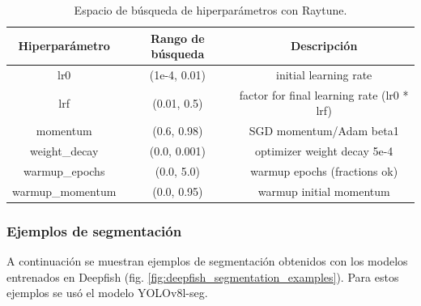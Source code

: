 \begin{table}[htbp]
\centering
\caption[Espacio de búsqueda de hiperparámetros con Raytune]{Espacio de búsqueda de hiperparámetros con Raytune.}
\label{tab:search_space}
\begin{tabular}{|c|c|c|}
\hline
\textbf{Hiperparámetro} & \textbf{Rango de búsqueda} & \textbf{Descripción} \\ \hline
lr0 & (1e-4, 0.01) & initial learning rate \\ \hline
lrf & (0.01, 0.5) & factor for final learning rate (lr0 * lrf) \\ \hline
momentum & (0.6, 0.98) & SGD momentum/Adam beta1 \\ \hline
weight\_decay & (0.0, 0.001) & optimizer weight decay 5e-4 \\ \hline
warmup\_epochs & (0.0, 5.0) & warmup epochs (fractions ok) \\ \hline
warmup\_momentum & (0.0, 0.95) & warmup initial momentum \\ \hline
\end{tabular}
\end{table}


\subsubsection{Ejemplos de segmentación}
A continuación se muestran ejemplos de segmentación obtenidos con los modelos entrenados en Deepfish (fig. \ref{fig:deepfish_segmentation_examples}). Para estos ejemplos se usó el modelo YOLOv8l-seg.

